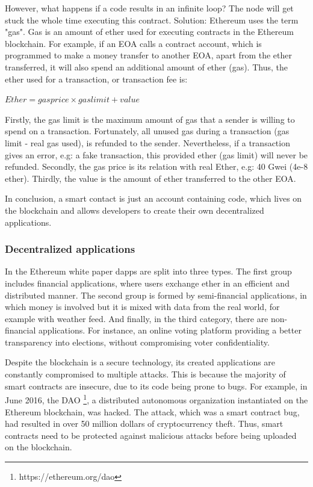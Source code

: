However, what happens if a code results in an infinite loop? The node will get stuck the whole time executing this contract. Solution: Ethereum uses the term "gas". Gas is an amount of ether used for executing contracts in the Ethereum blockchain. For example, if an EOA calls a contract account, which is programmed to make a money transfer to another EOA, apart from the ether transferred, it will also spend an additional amount of ether (gas). Thus, the ether used for a transaction, or transaction fee is:

\begin{description}
	\item $Ether = gas price \times gas limit + value$
\end{description}

Firstly, the gas limit is the maximum amount of gas that a sender is willing to spend on a transaction. Fortunately, all unused gas during a transaction (gas limit - real gas used), is refunded to the sender. Nevertheless, if a transaction gives an error, e.g: a fake transaction, this provided ether (gas limit) will never be refunded. Secondly, the gas price is its relation with real Ether, e.g: 40 Gwei (4e-8 ether). Thirdly, the value is the amount of ether transferred to the other EOA.

In conclusion, a smart contact is just an account containing code, which lives on the blockchain and allows developers to create their own decentralized applications. 

\subsubsection{Decentralized applications}

In the Ethereum white paper \cite{buterin2014next} dapps are split into three types. The first group includes financial applications, where users exchange ether in an efficient and distributed manner. The second group is formed by semi-financial applications, in which money is involved but it is mixed with data from the real world, for example with weather feed. And finally, in the third category, there are non-financial applications. For instance, an online voting platform providing a better transparency into elections, without compromising voter confidentiality.

Despite the blockchain is a secure technology, its created applications are constantly compromised to multiple attacks. This is because the majority of smart contracts are insecure, due to its code being prone to bugs.
For example, in June 2016, the DAO \footnote{https://ethereum.org/dao}, a distributed autonomous organization instantiated on the Ethereum blockchain, was hacked. The attack, which was a smart contract bug, had resulted in over 50 million dollars of cryptocurrency theft. Thus, smart contracts need to be protected against malicious attacks before being uploaded on the blockchain.

